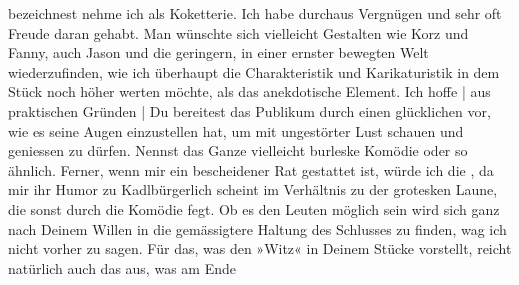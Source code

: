 \begin{ledgroupsized}[t]{13cm}
               bezeichnest nehme ich als Koketterie. Ich habe durchaus Vergnügen und sehr oft Freude
               daran gehabt. Man wünschte sich vielleicht Gestalten wie Korz und Fanny, auch Jason und
               die geringern, in einer ernster bewegten Welt wiederzufinden, wie ich überhaupt die
               Charakteristik und Karikaturistik in dem Stück noch höher werten möchte, als das
               anekdotische Element. Ich hoffe | aus praktischen Gründen | Du bereitest das Publikum
               durch einen glücklichen \label{K_L01721_1v}\label{K_L01721_1h}{ }\label{T_L01721_1v}\label{T_L01721_1h} vor, wie es seine Augen
               einzustellen hat, um mit ungestörter Lust schauen und geniessen zu dürfen. Nennst das
               Ganze vielleicht burleske Komödie oder so ähnlich. Ferner, wenn mir ein bescheidener
               Rat gestattet ist, würde ich die \label{K_L01721_2v}\label{K_L01721_2h}, da mir ihr Humor zu Kadlbürgerlich scheint im Verhältnis zu der grotesken Laune, die sonst durch
               die Komödie fegt. Ob es den Leuten möglich sein wird sich ganz nach Deinem {\pb}Willen in die
               gemässigtere Haltung des Schlusses zu finden, wag ich nicht vorher zu sagen. Für das,
               was den »Witz« in Deinem Stücke vorstellt, reicht natürlich auch das aus, was am Ende

\end{ledgroupsized}
